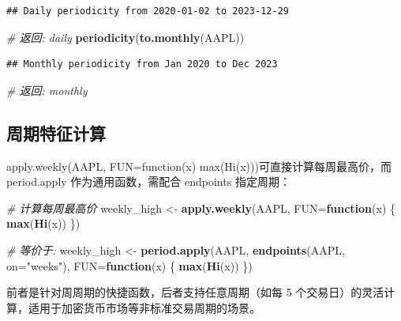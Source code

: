 \documentclass[]{ctexbook}
\newenvironment{Shaded}{\begin{snugshade}}{\end{snugshade}}
\newcommand{\AttributeTok}[1]{\textcolor[rgb]{0.13,0.29,0.53}{#1}}
\newcommand{\CommentTok}[1]{\textcolor[rgb]{0.56,0.35,0.01}{\textit{#1}}}
\newcommand{\ControlFlowTok}[1]{\textcolor[rgb]{0.13,0.29,0.53}{\textbf{#1}}}
\newcommand{\FunctionTok}[1]{\textcolor[rgb]{0.13,0.29,0.53}{\textbf{#1}}}
\newcommand{\NormalTok}[1]{#1}
\newcommand{\OtherTok}[1]{\textcolor[rgb]{0.56,0.35,0.01}{#1}}
\newcommand{\StringTok}[1]{\textcolor[rgb]{0.31,0.60,0.02}{#1}}
\begin{document}
\begin{verbatim}
## Daily periodicity from 2020-01-02 to 2023-12-29
\end{verbatim}

\begin{Shaded}
\begin{Highlighting}[]
\CommentTok{\# 返回: \textquotesingle{}daily\textquotesingle{}}
\FunctionTok{periodicity}\NormalTok{(}\FunctionTok{to.monthly}\NormalTok{(AAPL))}
\end{Highlighting}
\end{Shaded}

\begin{verbatim}
## Monthly periodicity from Jan 2020 to Dec 2023
\end{verbatim}

\begin{Shaded}
\begin{Highlighting}[]
\CommentTok{\# 返回: \textquotesingle{}monthly\textquotesingle{}}
\end{Highlighting}
\end{Shaded}

\subsection{周期特征计算}\label{ux5468ux671fux7279ux5f81ux8ba1ux7b97}

apply.weekly(AAPL, FUN=function(x) max(Hi(x)))可直接计算每周最高价，而 period.apply 作为通用函数，需配合 endpoints 指定周期：

\begin{Shaded}
\begin{Highlighting}[]
\CommentTok{\# 计算每周最高价}
\NormalTok{weekly\_high }\OtherTok{\textless{}{-}} \FunctionTok{apply.weekly}\NormalTok{(AAPL, }\AttributeTok{FUN=}\ControlFlowTok{function}\NormalTok{(x) \{ }\FunctionTok{max}\NormalTok{(}\FunctionTok{Hi}\NormalTok{(x)) \})}

\CommentTok{\# 等价于:}
\NormalTok{weekly\_high }\OtherTok{\textless{}{-}} \FunctionTok{period.apply}\NormalTok{(AAPL, }\FunctionTok{endpoints}\NormalTok{(AAPL, }\AttributeTok{on=}\StringTok{"weeks"}\NormalTok{), }
                           \AttributeTok{FUN=}\ControlFlowTok{function}\NormalTok{(x) \{ }\FunctionTok{max}\NormalTok{(}\FunctionTok{Hi}\NormalTok{(x)) \})}
\end{Highlighting}
\end{Shaded}

前者是针对周周期的快捷函数，后者支持任意周期（如每 5 个交易日）的灵活计算，适用于加密货币市场等非标准交易周期的场景。
\end{document}
